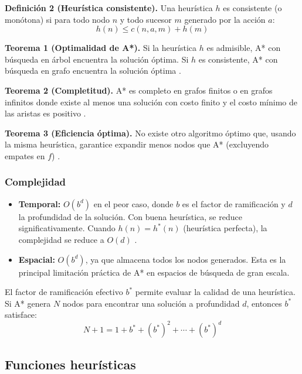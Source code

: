 \textbf{Definición 2 (Heurística consistente).} Una heurística $h$ es consistente (o monótona) si para todo nodo $n$ y todo sucesor $m$ generado por la acción $a$:
\begin{equation}
    h(n) \leq c(n, a, m) + h(m)
    \label{eq:consistent}
\end{equation}

\textbf{Teorema 1 (Optimalidad de A*).} Si la heurística $h$ es admisible, A* con búsqueda en árbol encuentra la solución óptima. Si $h$ es consistente, A* con búsqueda en grafo encuentra la solución óptima \cite{hart1968formal}.

\textbf{Teorema 2 (Completitud).} A* es completo en grafos finitos o en grafos infinitos donde existe al menos una solución con costo finito y el costo mínimo de las aristas es positivo \cite{pearl1984heuristics}.

\textbf{Teorema 3 (Eficiencia óptima).} No existe otro algoritmo óptimo que, usando la misma heurística, garantice expandir menos nodos que A* (excluyendo empates en $f$) \cite{dechter1985generalized}.

\subsubsection{Complejidad}

\begin{itemize}
    \item \textbf{Temporal:} $O(b^d)$ en el peor caso, donde $b$ es el factor de ramificación y $d$ la profundidad de la solución. Con buena heurística, se reduce significativamente. Cuando $h(n) = h^*(n)$ (heurística perfecta), la complejidad se reduce a $O(d)$ \cite{fukunaga2017survey}.
    \item \textbf{Espacial:} $O(b^d)$, ya que almacena todos los nodos generados. Esta es la principal limitación práctica de A* en espacios de búsqueda de gran escala.
\end{itemize}

El factor de ramificación efectivo $b^*$ permite evaluar la calidad de una heurística. Si A* genera $N$ nodos para encontrar una solución a profundidad $d$, entonces $b^*$ satisface:
\begin{equation}
    N + 1 = 1 + b^* + (b^*)^2 + \cdots + (b^*)^d
    \label{eq:branching}
\end{equation}

\subsection{Funciones heurísticas}

